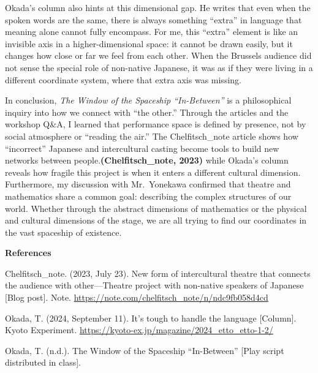 \documentclass[12pt]{article}
\begin{document}
Okada’s column also hints at this dimensional gap. He writes that even when the spoken words are the same, there is always something “extra” in language that meaning alone cannot fully encompass. For me, this “extra” element is like an invisible axis in a higher-dimensional space: it cannot be drawn easily, but it changes how close or far we feel from each other. When the Brussels audience did not sense the special role of non-native Japanese, it was as if they were living in a different coordinate system, where that extra axis was missing.

In conclusion, \textit{The Window of the Spaceship ``In-Between''} is a philosophical inquiry into how we connect with ``the other.” Through the articles and the workshop Q\&A, I learned that performance space is defined by presence, not by social atmosphere or ``reading the air.” The Chelfitsch\_note article shows how ``incorrect” Japanese and intercultural casting become tools to build new networks between people.\textbf{(Chelfitsch\_note, 2023)} while Okada’s column reveals how fragile this project is when it enters a different cultural dimension. Furthermore, my discussion with Mr.\ Yonekawa confirmed that theatre and mathematics share a common goal: describing the complex structures of our world. Whether through the abstract dimensions of mathematics or the physical and cultural dimensions of the stage, we are all trying to find our coordinates in the vast spaceship of existence.

\newpage
\begin{center}
    \textbf{References}
\end{center}

\noindent
\vspace{-1em} 

{
\setlength{\parindent}{0cm}
\setlength{\hangindent}{1.27cm}

Chelfitsch\_note. (2023, July 23). New form of intercultural theatre that connects the audience with other---Theatre project with non-native speakers of Japanese [Blog post]. Note.
\url{https://note.com/chelfitsch_note/n/ndc9fb058d4cd}

Okada, T. (2024, September 11). It's tough to handle the language [Column]. Kyoto Experiment. \url{https://kyoto-ex.jp/magazine/2024_etto_etto-1-2/}

Okada, T. (n.d.). The Window of the Spaceship ``In-Between'' [Play script distributed in class].
}
\end{document}
